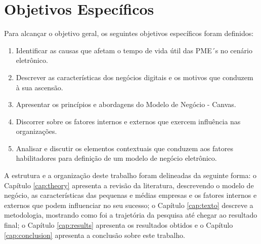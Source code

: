 \section{Objetivos Específicos}
\label{subsec:framing}

Para alcançar o objetivo geral, os seguintes objetivos específicos foram definidos:

\begin{enumerate}
\item Identificar as causas que afetam o tempo de vida útil das PME´s no cenário eletrônico.
\item Descrever as características dos negócios digitais e os motivos que conduzem à sua ascensão.
\item Apresentar os princípios e abordagens do Modelo de Negócio - Canvas. 
\item Discorrer sobre os fatores internos e externos que exercem influência nas organizações.
\item Analisar e discutir os elementos contextuais que conduzem aos fatores habilitadores para definição de um modelo de negócio eletrônico.
\end{enumerate}

A estrutura e a organização deste trabalho foram delineadas da seguinte forma: o Capítulo \ref{cap:theory} apresenta a revisão da literatura, descrevendo o modelo de negócio, as características das pequenas e médias empresas e os fatores internos e externos que podem influenciar no seu sucesso; o Capítulo \ref{cap:texto} descreve a metodologia, mostrando como foi a trajetória da pesquisa até chegar ao resultado final; o Capítulo \ref{cap:results} apresenta os resultados obtidos  e o Capítulo \ref{cap:conclusion} apresenta a conclusão sobre este trabalho.





